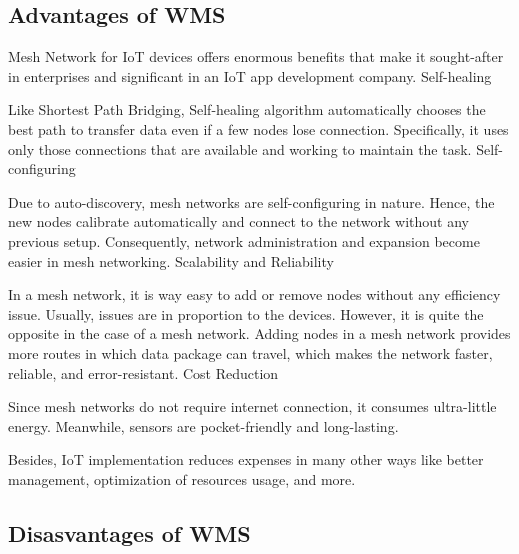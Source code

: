 		
		
	
	
	
	
		\subsection{Advantages of WMS}
		
			Mesh Network for IoT devices offers enormous benefits that make it sought-after in enterprises and significant in an IoT app development company.
			Self-healing
			
			Like Shortest Path Bridging, Self-healing algorithm automatically chooses the best path to transfer data even if a few nodes lose connection. Specifically, it uses only those connections that are available and working to maintain the task.
			Self-configuring
			
			Due to auto-discovery, mesh networks are self-configuring in nature. Hence, the new nodes calibrate automatically and connect to the network without any previous setup. Consequently, network administration and expansion become easier in mesh networking.
			Scalability and Reliability
			
			In a mesh network, it is way easy to add or remove nodes without any efficiency issue. Usually, issues are in proportion to the devices. However, it is quite the opposite in the case of a mesh network. Adding nodes in a mesh network provides more routes in which data package can travel, which makes the network faster, reliable, and error-resistant.
			Cost Reduction
			
			Since mesh networks do not require internet connection, it consumes ultra-little energy. Meanwhile, sensors are pocket-friendly and long-lasting.
			
			Besides, IoT implementation reduces expenses in many other ways like better management, optimization of resources usage, and more.
		
		\subsection{Disasvantages of WMS}
		
